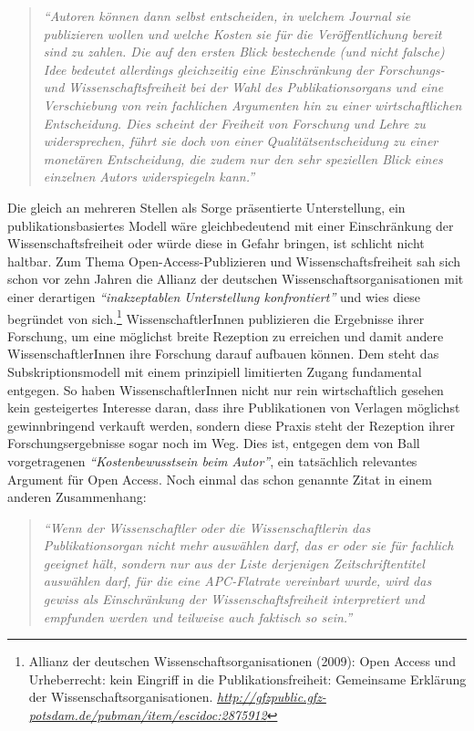 \documentclass[a4paper,
fontsize=11pt,
oneside,
numbers=noperiodatend,
parskip=half-,
bibliography=totoc,
final
]{scrartcl}
\begin{document}
\begin{quote}
\emph{\enquote{Autoren können dann selbst entscheiden, in welchem
Journal sie publizieren wollen und welche Kosten sie für die
Veröffentlichung bereit sind zu zahlen. Die auf den ersten Blick
bestechende (und nicht falsche) Idee bedeutet allerdings gleichzeitig
eine Einschränkung der Forschungs- und Wissenschaftsfreiheit bei der
Wahl des Publikationsorgans und eine Verschiebung von rein fachlichen
Argumenten hin zu einer wirtschaftlichen Entscheidung. Dies scheint der
Freiheit von Forschung und Lehre zu widersprechen, führt sie doch von
einer Qualitätsentscheidung zu einer monetären Entscheidung, die zudem
nur den sehr speziellen Blick eines einzelnen Autors widerspiegeln
kann.}}
\end{quote}

Die gleich an mehreren Stellen als Sorge präsentierte Unterstellung, ein
publikationsbasiertes Modell wäre gleichbedeutend mit einer
Einschränkung der Wissenschaftsfreiheit oder würde diese in Gefahr
bringen, ist schlicht nicht haltbar. Zum Thema Open-Access-Publizieren
und Wissenschaftsfreiheit sah sich schon vor zehn Jahren die Allianz der
deutschen Wissenschaftsorganisationen mit einer derartigen
\emph{\enquote{inakzeptablen Unterstellung konfrontiert}} und wies diese
begründet von sich.\footnote{Allianz der deutschen
  Wissenschaftsorganisationen (2009): Open Access und Urheberrecht: kein
  Eingriff in die Publikationsfreiheit: Gemeinsame Erklärung der
  Wissenschaftsorganisationen.
  \href{http://gfzpublic.gfz-potsdam.de/pubman/item/escidoc:2875912}{\emph{http://gfzpublic.gfz-potsdam.de/pubman/item/escidoc:2875912}}}
WissenschaftlerInnen publizieren die Ergebnisse ihrer Forschung, um eine
möglichst breite Rezeption zu erreichen und damit andere
WissenschaftlerInnen ihre Forschung darauf aufbauen können. Dem steht
das Subskriptionsmodell mit einem prinzipiell limitierten Zugang
fundamental entgegen. So haben WissenschaftlerInnen nicht nur rein
wirtschaftlich gesehen kein gesteigertes Interesse daran, dass ihre
Publikationen von Verlagen möglichst gewinnbringend verkauft werden,
sondern diese Praxis steht der Rezeption ihrer Forschungsergebnisse
sogar noch im Weg. Dies ist, entgegen dem von Ball vorgetragenen
\emph{\enquote{Kostenbewusstsein beim Autor}}, ein tatsächlich
relevantes Argument für Open Access. Noch einmal das schon genannte
Zitat in einem anderen Zusammenhang:

\begin{quote}
\emph{\enquote{Wenn der Wissenschaftler oder die Wissenschaftlerin das
Publikationsorgan nicht mehr auswählen darf, das er oder sie für
fachlich geeignet hält, sondern nur aus der Liste derjenigen
Zeitschriftentitel auswählen darf, für die eine APC-Flatrate vereinbart
wurde, wird das gewiss als Einschränkung der Wissenschaftsfreiheit
interpretiert und empfunden werden und teilweise auch faktisch so
sein.}}
\end{quote}
\end{document}
